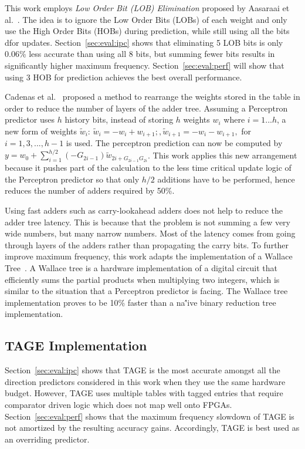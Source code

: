 \documentclass[conference]{IEEEtran}
\begin{document}
This work employs \textit{Low Order Bit (LOB) Elimination} proposed by Aasaraai et al.~\cite{lob}. The idea is to ignore the Low Order Bits (LOBs) of each weight and only use the High Order Bits (HOBs) during prediction, while still using all the bits dfor updates. Section~\ref{sec:eval:ipc} shows that eliminating 5 LOB bits is only 0.06\% less accurate than using all 8 bits, but summing fewer bits results in significantly higher maximum frequency. Section~\ref{sec:eval:perf} will show that using 3 HOB for prediction achieves the best overall performance.

Cadenas et al.~\cite{perceptronRearrange} proposed a method to rearrange the weights stored in the table in order to reduce the number of layers of the adder tree. Assuming a Perceptron predictor uses $h$ history bits, instead of storing $h$ weights $w_i$ where $i = 1 ... h$, a new form of weights $\widetilde{w}_i$: $\widetilde{w}_i = - w_i + w_{i+1};, \widetilde{w}_{i+1} = - w_i - w_{i+1},$ for $i = 1, 3, ..., h-1$ is used. The perceptron prediction can now be computed by $y = w_0 + \sum_{i=1}^{h/2}(-G_{2i-1})\widetilde{w}_{2i+G_{2i-1}G_{2i}}$. This work applies this new arrangement because it pushes part of the calculation to the less time critical update logic of the Perceptron predictor so that only $h/2$ additions have to be performed, hence reduces the number of adders required by 50\%.

Using fast adders such as carry-lookahead adders does not help to reduce the adder tree latency. This is because that the problem is not summing a few very wide numbers, but many narrow numbers. Most of the latency comes from going through layers of the adders rather than propagating the carry bits. To further improve maximum frequency, this work adapts the implementation of a Wallace Tree~\cite{wallacetree}. A Wallace tree is a hardware implementation of a digital circuit that efficiently sums the partial products when multiplying two integers, which is similar to the situation that a Perceptron predictor is facing. The Wallace tree implementation proves to be 10\% faster than a na\''ive binary reduction tree implementation. 

\subsection{TAGE Implementation}
\label{sec:fpga:tage}
Section~\ref{sec:eval:ipc} shows that TAGE  is the most accurate amongst all the direction predictors considered in this work when they use the same hardware budget. However, TAGE uses multiple tables with tagged entries that require comparator driven logic which does not map well onto FPGAs. Section~\ref{sec:eval:perf} shows that the maximum frequency slowdown of TAGE is not amortized by the resulting accuracy gains. Accordingly, TAGE is best used as an overriding predictor.
\end{document}

